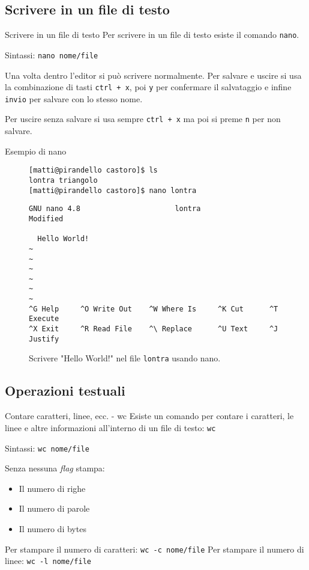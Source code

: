 \subsection{Scrivere in un file di testo}
\begin{frame}[fragile]{Scrivere in un file di testo}
  Per scrivere in un file di testo esiste il comando \texttt{nano}.\bigskip

  Sintassi: \texttt{nano nome/file}\bigskip

  Una volta dentro l'editor si può scrivere normalmente. Per salvare e uscire
  si usa la combinazione di tasti \texttt{ctrl + x}, poi \texttt{y} per 
  confermare il salvataggio e infine \texttt{invio} per salvare con lo stesso
  nome.\bigskip

  Per uscire senza salvare si usa sempre \texttt{ctrl + x} ma poi si preme
  \texttt{n} per non salvare.
\end{frame}

\begin{frame}[fragile]{Esempio di nano}
  \begin{figure}
    \begin{lstlisting}[basicstyle=\footnotesize]
[matti@pirandello castoro]$ ls
lontra triangolo
[matti@pirandello castoro]$ nano lontra
  \end{lstlisting}
  \end{figure}
  \begin{figure}
    \begin{lstlisting}[basicstyle=\tiny\ttfamily, frame=single, rulecolor=\color{black}]
  GNU nano 4.8                      lontra                      Modified  

  Hello World!
~
~
~
~
~
~
^G Help     ^O Write Out    ^W Where Is     ^K Cut      ^T Execute
^X Exit     ^R Read File    ^\ Replace      ^U Text     ^J Justify
    \end{lstlisting}
    \caption{Scrivere "Hello World!" nel file \texttt{lontra} usando nano.}
  \end{figure}
\end{frame}

\subsection{Operazioni testuali}
\begin{frame}{Contare caratteri, linee, ecc. - wc}
  Esiste un comando per contare i caratteri, le linee e altre informazioni
  all'interno di un file di testo: \texttt{wc}\bigskip

  Sintassi: \texttt{wc nome/file}\bigskip

  Senza nessuna \textit{flag} stampa:
  \begin{itemize}
    \item Il numero di righe
    \item Il numero di parole
    \item Il numero di bytes
  \end{itemize}
  Per stampare il numero di caratteri: \texttt{wc -c nome/file}
  Per stampare il numero di linee: \texttt{wc -l nome/file}
\end{frame}

